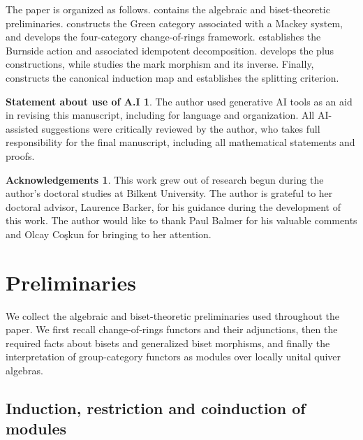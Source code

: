 \documentclass{amsart}
\numberwithin{equation}{section}%
\theoremstyle{remark}
\theoremstyle{definition}
\newtheorem*{Ack}{Acknowledgements}
\newtheorem*{AI}{Statement about use of A.I}
\begin{document}
The paper is organized as follows.
 contains the algebraic and
biset-theoretic preliminaries.
constructs the Green category associated with a Mackey system,
and  develops the four-category
change-of-rings framework.
establishes the Burnside  action and associated idempotent decomposition.
 develops the plus constructions,
while  studies the mark morphism and its inverse.
Finally,  constructs the
canonical induction map and establishes the splitting criterion.


%
\begin{AI}
The author used generative AI tools as an aid in revising
this manuscript, including for language and organization.
All AI-assisted suggestions were critically reviewed by the author, who
takes full responsibility for the final manuscript, including all
mathematical statements and proofs.
\end{AI}

%
\begin{Ack}
This work grew out of research begun during the author's doctoral
studies at Bilkent University. The author is grateful to her doctoral
advisor, Laurence Barker, for his guidance during the development
of this work. The author would like to thank Paul Balmer for his 
valuable comments and Olcay Co\c{s}kun for bringing \cite{Coskun08} 
to her attention.
\end{Ack}


%
\section{Preliminaries}
\label{sec:preliminaries}
%
We collect the algebraic and biset-theoretic preliminaries used
throughout the paper. We first recall change-of-rings functors and
their adjunctions, then the required facts about bisets and generalized
biset morphisms, and finally the interpretation of group-category
functors as modules over locally unital quiver algebras.

%
\subsection{Induction, restriction and coinduction of modules}\
\label{ssec:induction-restriction-coinduction}
%
\end{document}
